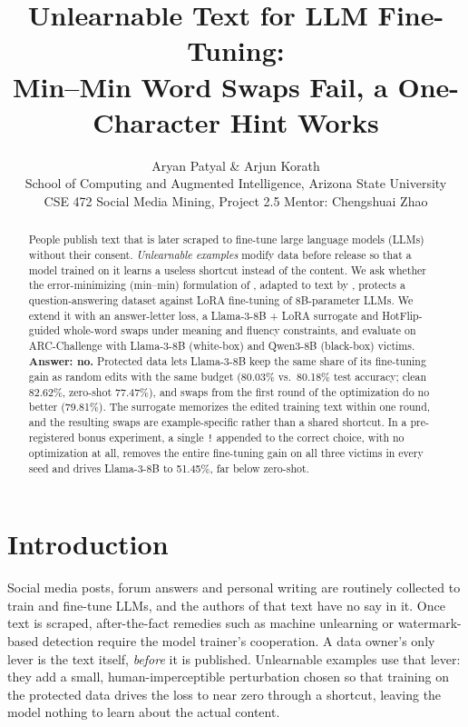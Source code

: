 \documentclass{article}
\title{Unlearnable Text for LLM Fine-Tuning:\\ Min--Min Word Swaps Fail, a One-Character Hint Works}
\author{Aryan Patyal \& Arjun Korath\\
School of Computing and Augmented Intelligence, Arizona State University\\
CSE 472 Social Media Mining, Project 2.5 \quad Mentor: Chengshuai Zhao}
\begin{document}
\maketitle

\begin{abstract}
People publish text that is later scraped to fine-tune large language models (LLMs) without their consent.
\emph{Unlearnable examples} modify data before release so that a model trained on it learns a useless shortcut instead of
the content. We ask whether the error-minimizing (min--min) formulation of \citet{huang2021unlearnable}, adapted to
text by \citet{li2023maketext}, protects a question-answering dataset against LoRA fine-tuning of 8B-parameter LLMs.
We extend it with an answer-letter loss, a Llama-3-8B + LoRA surrogate and HotFlip-guided whole-word swaps under
meaning and fluency constraints, and evaluate on ARC-Challenge with Llama-3-8B (white-box) and Qwen3-8B (black-box)
victims. \textbf{Answer: no.} Protected data lets Llama-3-8B keep the same share of its fine-tuning gain as random edits
with the same budget (80.03\% vs.\ 80.18\% test accuracy; clean 82.62\%, zero-shot 77.47\%), and swaps from the first
round of the optimization do no better (79.81\%). The surrogate memorizes the edited training text within one round,
and the resulting swaps are example-specific rather than a shared shortcut. In a pre-registered bonus experiment, a
single \texttt{!} appended to the correct choice, with no optimization at all, removes the entire fine-tuning gain on
all three victims in every seed and drives Llama-3-8B to 51.45\%, far below zero-shot.
\end{abstract}

\section{Introduction}
Social media posts, forum answers and personal writing are routinely collected to train and fine-tune LLMs, and the
authors of that text have no say in it. Once text is scraped, after-the-fact remedies such as machine unlearning or
watermark-based detection require the model trainer's cooperation. A data owner's only lever is the text itself,
\emph{before} it is published. Unlearnable examples \citep{huang2021unlearnable,li2025survey} use that lever: they add a
small, human-imperceptible perturbation chosen so that training on the protected data drives the loss to near zero
through a shortcut, leaving the model nothing to learn about the actual content.
\end{document}
